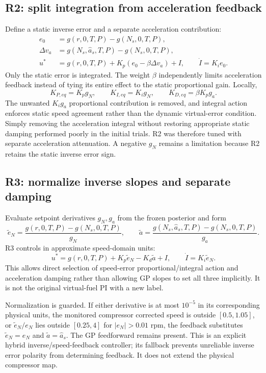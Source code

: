 \documentclass[11pt,a4paper]{article}
\begin{document}
\subsection{R2: split integration from acceleration feedback}
Define a static inverse error and a separate acceleration contribution:
\begin{align}
e_0&=g(r,0,T,P)-g(N_s,0,T,P),\\
\Delta v_a&=g(N_s,\hat a_s,T,P)-g(N_s,0,T,P),\\
u^*&=g(r,0,T,P)+K_p(e_0-\beta\Delta v_a)+I,\qquad \dot I=K_i e_0.
\end{align}
Only the static error is integrated. The weight $\beta$ independently limits acceleration feedback instead of tying its entire effect to the static proportional gain. Locally,
\begin{equation}
K_{P,eq}=K_pg_N,\qquad K_{I,eq}=K_ig_N,\qquad K_{D,eq}=\beta K_pg_a.
\end{equation}
The unwanted $K_i g_a$ proportional contribution is removed, and integral action enforces static speed agreement rather than the dynamic virtual-error condition. Simply removing the acceleration integral without restoring appropriate static damping performed poorly in the initial trials. R2 was therefore tuned with separate acceleration attenuation. A negative $g_N$ remains a limitation because R2 retains the static inverse error sign.

\subsection{R3: normalize inverse slopes and separate damping}
Evaluate setpoint derivatives $g_N,g_a$ from the frozen posterior and form
\begin{equation}
\tilde e_N=\frac{g(r,0,T,P)-g(N_s,0,T,P)}{g_N},\qquad
\tilde a=\frac{g(N_s,\hat a_s,T,P)-g(N_s,0,T,P)}{g_a}.
\end{equation}
R3 controls in approximate speed-domain units:
\begin{equation}
u^*=g(r,0,T,P)+K_p\tilde e_N-K_d\tilde a+I,\qquad \dot I=K_i\tilde e_N.
\end{equation}
This allows direct selection of speed-error proportional/integral action and acceleration damping rather than allowing GP slopes to set all three implicitly. It is not the original virtual-fuel PI with a new label.

Normalization is guarded. If either derivative is at most $10^{-5}$ in its corresponding physical units, the monitored compressor corrected speed is outside $[0.5,1.05]$, or $\tilde e_N/e_N$ lies outside $[0.25,4]$ for $|e_N|>0.01$ rpm, the feedback substitutes $\tilde e_N=e_N$ and $\tilde a=\hat a_s$. The GP feedforward remains present. This is an explicit hybrid inverse/speed-feedback controller; its fallback prevents unreliable inverse error polarity from determining feedback. It does not extend the physical compressor map.
\end{document}
